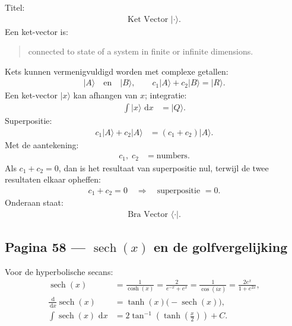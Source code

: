 \documentclass[11pt]{article}
\newcommand{\dd}{\,\mathrm{d}}
\newcommand{\td}[2]{\frac{\dd #1}{\dd #2}}
\newcommand{\sech}{\operatorname{sech}}
\begin{document}
Titel:
\begin{align*}
\text{Ket Vector }|\cdot\rangle.
\end{align*}
Een ket-vector is:
\begin{quote}
connected to state of a system in finite or infinite dimensions.
\end{quote}
Kets kunnen vermenigvuldigd worden met complexe getallen:
\begin{align*}
|A\rangle \quad\text{en}\quad |B\rangle,
\qquad
c_1|A\rangle+c_2|B\rangle=|R\rangle.
\end{align*}
Een ket-vector $|x\rangle$ kan afhangen van $x$; integratie:
\begin{align*}
\int |x\rangle\,\dd x
&=
|Q\rangle.
\end{align*}
Superpositie:
\begin{align*}
c_1|A\rangle+c_2|A\rangle
&=
(c_1+c_2)|A\rangle.
\end{align*}
Met de aantekening:
\begin{align*}
c_1,\;c_2&=\text{numbers}.
\end{align*}
Als $c_1+c_2=0$, dan is het resultaat van superpositie nul, terwijl de twee resultaten elkaar opheffen:
\begin{align*}
c_1+c_2=0
\quad\Longrightarrow\quad
\text{superpositie }=0.
\end{align*}
Onderaan staat:
\begin{align*}
\text{Bra Vector }\langle\cdot|.
\end{align*}

\subsection*{Pagina 58 --- $\sech(x)$ en de golfvergelijking}

Voor de hyperbolische secans:
\begin{align*}
\sech(x)
&=
\frac{1}{\cosh(x)}
=
\frac{2}{e^{-x}+e^{x}}
=
\frac{1}{\cos(ix)}
=
\frac{2e^x}{1+e^{2x}},\\
\td{}{x}\sech(x)
&=
\tanh(x)\bigl(-\sech(x)\bigr),\\
\int \sech(x)\,\dd x
&=
2\tan^{-1}\left(\tanh\left(\frac{x}{2}\right)\right)+C.
\end{align*}
\end{document}
